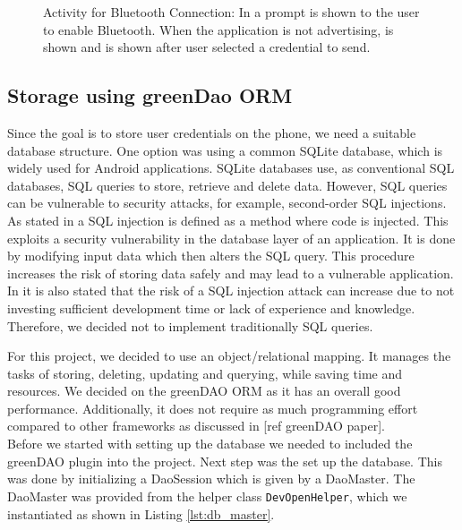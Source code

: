 \begin{figure}[H]
\caption[Activity for Bluetooth Connection]{Activity for Bluetooth Connection: In \protect{} a prompt is shown to the user to enable Bluetooth. When the application is not advertising, \protect{} is shown and \protect{} is shown after user selected a credential to send.}
\label{fig:connectionactivity}
\end{figure}



\subsection{Storage using greenDao ORM}
Since the goal is to store user credentials on the phone,  we need a suitable database structure. One option was using a common SQLite database, which is widely used for Android applications. SQLite databases use, as conventional SQL databases, SQL queries to store, retrieve and delete data. However, SQL queries can be vulnerable to security attacks, for example, second-order SQL injections. As stated in \cite{katole2018detection} a SQL injection is defined as a method where code is injected. This exploits a security vulnerability in the database layer of an application. It is done by modifying input data which then alters the SQL query. This procedure increases the risk of storing data safely and may lead to a vulnerable application. In \cite{katole2018detection} it is also stated that the risk of a SQL injection attack can increase due to not investing sufficient development time or lack of experience and knowledge. Therefore, we decided not to implement traditionally SQL queries.

For this project, we decided to use an object/relational mapping. It manages the tasks of storing, deleting, updating and querying, while saving time and resources. We decided on the greenDAO ORM \cite{Greendao} as it has an overall good performance. Additionally, it does not require as much programming effort compared to other frameworks as discussed in [ref greenDAO paper]. \\

Before we started with setting up the database we needed to included the greenDAO plugin into the project. Next step was the set up the database. This was done by initializing a DaoSession which is given by a DaoMaster. The DaoMaster was provided from the helper class \texttt{DevOpenHelper}, which we instantiated as shown in Listing \ref{lst:db_master}.

